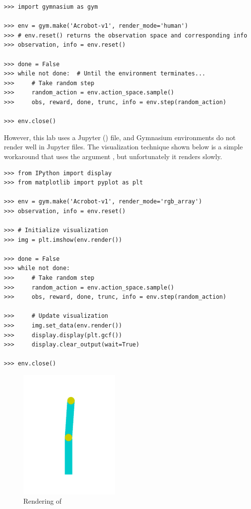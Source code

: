 \begin{lstlisting}
>>> import gymnasium as gym

>>> env = gym.make('Acrobot-v1', render_mode='human')
>>> # env.reset() returns the observation space and corresponding info
>>> observation, info = env.reset()  

>>> done = False 
>>> while not done:  # Until the environment terminates...
>>>     # Take random step
>>>     random_action = env.action_space.sample()
>>>     obs, reward, done, trunc, info = env.step(random_action)

>>> env.close()
\end{lstlisting}
However, this lab uses a Jupyter () file, and Gymnasium environments do not render well in Jupyter files.
The visualization technique shown below is a simple workaround that uses the argument , but unfortunately it renders slowly.
\begin{lstlisting}
>>> from IPython import display
>>> from matplotlib import pyplot as plt

>>> env = gym.make('Acrobot-v1', render_mode='rgb_array')
>>> observation, info = env.reset()

>>> # Initialize visualization
>>> img = plt.imshow(env.render())

>>> done = False
>>> while not done:
>>>     # Take random step
>>>     random_action = env.action_space.sample()
>>>     obs, reward, done, trunc, info = env.step(random_action)

>>>     # Update visualization
>>>     img.set_data(env.render())
>>>     display.display(plt.gcf())
>>>     display.clear_output(wait=True)

>>> env.close()
\end{lstlisting}

\begin{figure}[H]
\includegraphics[width=5cm]{figures/acrobot.pdf}
\caption{Rendering of }
\end{figure}

